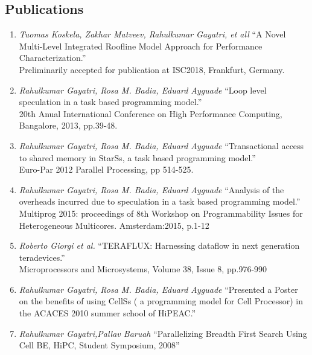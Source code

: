 \documentclass[margin]{res}
\begin{document}
\begin{resume}
\section{Publications}
%
\begin{enumerate}
	   \item \textit{Tuomas Koskela, Zakhar Matveev, Rahulkumar Gayatri, et all}
			 \enquote{A Novel Multi-Level Integrated Roofline Model Approach for Performance Characterization.} \\
             Preliminarily accepted for publication at ISC2018, Frankfurt, Germany.
%
	   \item \textit{Rahulkumar Gayatri, Rosa M. Badia, Eduard Ayguade}
			 \enquote{Loop level speculation in a task based programming model.} \\
             20th Anual International Conference on High Performance Computing, Bangalore, 2013, pp.39-48.
%
	   \item \textit{Rahulkumar Gayatri, Rosa M. Badia, Eduard Ayguade}
			 \enquote{Transactional access to shared memory in StarSs, a task based programming model.} \\
             Euro-Par 2012 Parallel Processing, pp 514-525.
%
	   \item \textit{Rahulkumar Gayatri, Rosa M. Badia, Eduard Ayguade}
			 \enquote{Analysis of the overheads incurred due to speculation in a task based programming model.} \\
             Multiprog 2015: proceedings of 8th Workshop on Programmability Issues for Heterogeneous Multicores. Amsterdam:2015, p.1-12
%
	   \item \textit{Roberto Giorgi et al.}
			 \enquote{TERAFLUX: Harnessing dataflow in next generation teradevices.} \\
             Microprocessors and Microsystems, Volume 38, Issue 8, pp.976-990
%
	   \item \textit{Rahulkumar Gayatri, Rosa M. Badia, Eduard Ayguade}
			 \enquote{Presented a Poster on the benefits of using CellSs ( a programming model for Cell Processor) in the ACACES 2010 summer school of HiPEAC.}
%
	   \item \textit{Rahulkumar Gayatri,Pallav Baruah} \enquote{Parallelizing Breadth First Search Using Cell BE, HiPC, Student Symposium, 2008}
%
\end {enumerate}
%

\end{resume}
\end{document}
